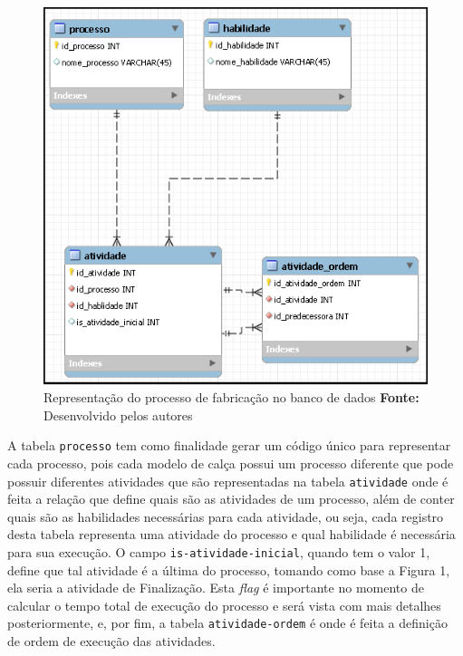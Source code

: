 \begin{figure}[h!]
	\centerline{\includegraphics[scale=0.7]{./imagens/representacao_processo.png}}
	\caption[Processo de fabricação]
	{Representação do processo de fabricação no banco de dados \textbf{Fonte:} Desenvolvido pelos autores}
	\label{fig:exemplo1}
\end{figure}

\par A tabela \texttt{processo} tem como finalidade gerar um código único para representar 
cada processo, pois cada modelo de calça possui um processo diferente que pode possuir 
diferentes atividades que são representadas na tabela \texttt{atividade} onde é feita a relação que define quais são
as atividades de um processo,  além de conter quais são as habilidades necessárias para cada atividade, ou seja, cada registro desta 
tabela representa uma atividade do processo e qual habilidade é necessária para sua execução. O campo 
\texttt{is-atividade-inicial}, quando tem o valor 1, define que tal atividade é a última do processo, 
tomando como base a Figura 1, ela seria a atividade de Finalização. Esta \textit{flag} é importante no momento de 
calcular o tempo total de execução do processo e será vista com mais detalhes posteriormente, e, por fim, a tabela 
\texttt{atividade-ordem} é onde é feita a definição de ordem de execução das atividades.

